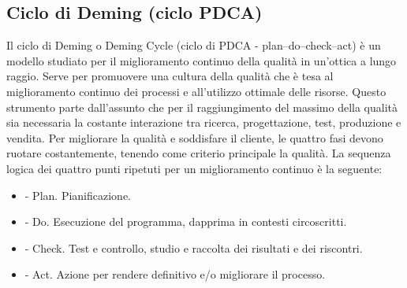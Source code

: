 \subsection{Ciclo di Deming (ciclo PDCA)} %

Il ciclo di Deming o Deming Cycle (ciclo di PDCA - plan–do–check–act) è un modello studiato per il miglioramento continuo della qualità in un'ottica a lungo raggio. Serve per promuovere una cultura della qualità che è tesa al miglioramento continuo dei processi e all'utilizzo ottimale delle risorse. Questo strumento parte dall'assunto che per il raggiungimento del massimo della qualità sia necessaria la costante interazione tra ricerca, progettazione, test, produzione e vendita. Per migliorare la qualità e soddisfare il cliente, le quattro fasi devono ruotare costantemente, tenendo come criterio principale la qualità.
La sequenza logica dei quattro punti ripetuti per un miglioramento continuo è la seguente:
\begin{itemize}
	\item {} - Plan. Pianificazione.
	\item {} - Do. Esecuzione del programma, dapprima in contesti circoscritti.
	\item {} - Check. Test e controllo, studio e raccolta dei risultati e dei riscontri.
	\item {} - Act. Azione per rendere definitivo e/o migliorare il processo.
\end{itemize}

